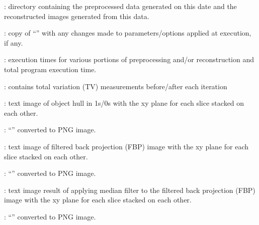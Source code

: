 \begin{tcbfunctionenv}
\begin{tcbparagraph}
\begin{deepList}[labelindent=1pt, leftmargin=*]
\begin{deepList}[labelindent=1pt, leftmargin=*]
\begin{deepList}[labelindent=1pt, leftmargin=*]
\begin{deepList}[labelindent=1pt, leftmargin=*]
\begin{deepList}[labelindent=1pt, leftmargin=*]
\begin{deepList}[labelindent=1pt, leftmargin=*]
\begin{deepList}[labelindent=1pt, leftmargin=*]
\begin{deepList}[labelindent=1pt, leftmargin=*]
                    				\item {} : directory containing the preprocessed data generated on this date and the reconstructed images generated from this data.
                                    \begin{deepList}[labelindent=1pt, leftmargin=*]
                                        \item {} : copy of ``'' with any changes made to parameters/options applied at execution, if any.
                                        \item {} : execution times for various portions of preprocessing and/or reconstruction and total program execution time.
                                        \item {} : contains total variation (TV) measurements before/after each iteration
                                        \item {} : text image of object hull in 1s/0s with the xy plane for each slice stacked on each other.
                                        \item {} : ``'' converted to PNG image.
                                        \item {} : text image of filtered back projection (FBP) image with the xy plane for each slice stacked on each other.
                                        \item {} : ``'' converted to PNG image.
                                        \item {} : text image result of applying median filter to the filtered back projection (FBP) image with the xy plane for each slice stacked on each other.
                                        \item {} : ``'' converted to PNG image.

\end{deepList}
\end{deepList}
\end{deepList}
\end{deepList}
\end{deepList}
\end{deepList}
\end{deepList}
\end{deepList}
\end{deepList}
\end{tcbparagraph}
\end{tcbfunctionenv}

